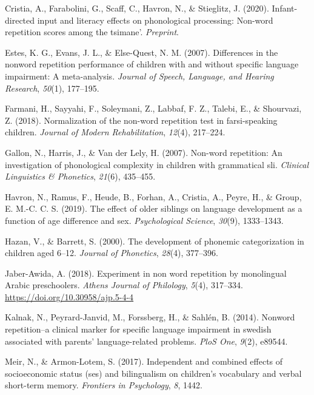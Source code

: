\documentclass[english,,man,floatsintext]{apa6}
\begin{document}
\leavevmode\hypertarget{ref-cristia2020infant}{}%
Cristia, A., Farabolini, G., Scaff, C., Havron, N., \& Stieglitz, J. (2020). Infant-directed input and literacy effects on phonological processing: Non-word repetition scores among the tsimane'. \emph{Preprint}.

\leavevmode\hypertarget{ref-estes2007differences}{}%
Estes, K. G., Evans, J. L., \& Else-Quest, N. M. (2007). Differences in the nonword repetition performance of children with and without specific language impairment: A meta-analysis. \emph{Journal of Speech, Language, and Hearing Research}, \emph{50}(1), 177--195.

\leavevmode\hypertarget{ref-farmani2018normalization}{}%
Farmani, H., Sayyahi, F., Soleymani, Z., Labbaf, F. Z., Talebi, E., \& Shourvazi, Z. (2018). Normalization of the non-word repetition test in farsi-speaking children. \emph{Journal of Modern Rehabilitation}, \emph{12}(4), 217--224.

\leavevmode\hypertarget{ref-gallon2007non}{}%
Gallon, N., Harris, J., \& Van der Lely, H. (2007). Non-word repetition: An investigation of phonological complexity in children with grammatical sli. \emph{Clinical Linguistics \& Phonetics}, \emph{21}(6), 435--455.

\leavevmode\hypertarget{ref-havron2019effect}{}%
Havron, N., Ramus, F., Heude, B., Forhan, A., Cristia, A., Peyre, H., \& Group, E. M.-C. C. S. (2019). The effect of older siblings on language development as a function of age difference and sex. \emph{Psychological Science}, \emph{30}(9), 1333--1343.

\leavevmode\hypertarget{ref-hazan2000development}{}%
Hazan, V., \& Barrett, S. (2000). The development of phonemic categorization in children aged 6--12. \emph{Journal of Phonetics}, \emph{28}(4), 377--396.

\leavevmode\hypertarget{ref-jabere2018xperiment}{}%
Jaber-Awida, A. (2018). Experiment in non word repetition by monolingual Arabic preschoolers. \emph{Athens Journal of Philology}, \emph{5}(4), 317--334. \url{https://doi.org/10.30958/ajp.5-4-4}

\leavevmode\hypertarget{ref-kalnak2014nonword}{}%
Kalnak, N., Peyrard-Janvid, M., Forssberg, H., \& Sahlén, B. (2014). Nonword repetition--a clinical marker for specific language impairment in swedish associated with parents' language-related problems. \emph{PloS One}, \emph{9}(2), e89544.

\leavevmode\hypertarget{ref-meir2017independent}{}%
Meir, N., \& Armon-Lotem, S. (2017). Independent and combined effects of socioeconomic status (ses) and bilingualism on children's vocabulary and verbal short-term memory. \emph{Frontiers in Psychology}, \emph{8}, 1442.
\end{document}
